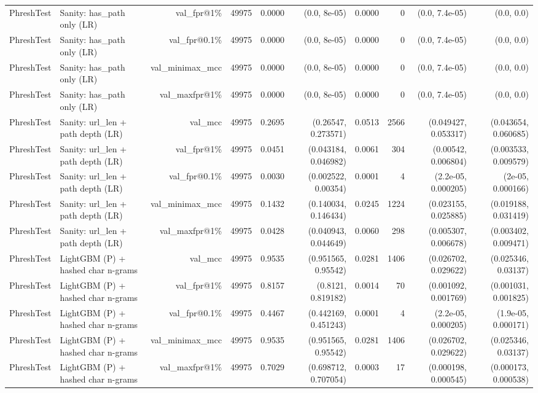 \begin{table}[t]
\begin{tabular}{llrrrrrrrr}
PhreshTest & Sanity: has\_path only (LR) & val\_fpr@1\% & 49975 & 0.0000 & (0.0, 8e-05) & 0.0000 & 0 & (0.0, 7.4e-05) & (0.0, 0.0) \\
PhreshTest & Sanity: has\_path only (LR) & val\_fpr@0.1\% & 49975 & 0.0000 & (0.0, 8e-05) & 0.0000 & 0 & (0.0, 7.4e-05) & (0.0, 0.0) \\
PhreshTest & Sanity: has\_path only (LR) & val\_minimax\_mcc & 49975 & 0.0000 & (0.0, 8e-05) & 0.0000 & 0 & (0.0, 7.4e-05) & (0.0, 0.0) \\
PhreshTest & Sanity: has\_path only (LR) & val\_maxfpr@1\% & 49975 & 0.0000 & (0.0, 8e-05) & 0.0000 & 0 & (0.0, 7.4e-05) & (0.0, 0.0) \\
PhreshTest & Sanity: url\_len + path depth (LR) & val\_mcc & 49975 & 0.2695 & (0.26547, 0.273571) & 0.0513 & 2566 & (0.049427, 0.053317) & (0.043654, 0.060685) \\
PhreshTest & Sanity: url\_len + path depth (LR) & val\_fpr@1\% & 49975 & 0.0451 & (0.043184, 0.046982) & 0.0061 & 304 & (0.00542, 0.006804) & (0.003533, 0.009579) \\
PhreshTest & Sanity: url\_len + path depth (LR) & val\_fpr@0.1\% & 49975 & 0.0030 & (0.002522, 0.00354) & 0.0001 & 4 & (2.2e-05, 0.000205) & (2e-05, 0.000166) \\
PhreshTest & Sanity: url\_len + path depth (LR) & val\_minimax\_mcc & 49975 & 0.1432 & (0.140034, 0.146434) & 0.0245 & 1224 & (0.023155, 0.025885) & (0.019188, 0.031419) \\
PhreshTest & Sanity: url\_len + path depth (LR) & val\_maxfpr@1\% & 49975 & 0.0428 & (0.040943, 0.044649) & 0.0060 & 298 & (0.005307, 0.006678) & (0.003402, 0.009471) \\
PhreshTest & LightGBM (P) + hashed char n-grams & val\_mcc & 49975 & 0.9535 & (0.951565, 0.95542) & 0.0281 & 1406 & (0.026702, 0.029622) & (0.025346, 0.03137) \\
PhreshTest & LightGBM (P) + hashed char n-grams & val\_fpr@1\% & 49975 & 0.8157 & (0.8121, 0.819182) & 0.0014 & 70 & (0.001092, 0.001769) & (0.001031, 0.001825) \\
PhreshTest & LightGBM (P) + hashed char n-grams & val\_fpr@0.1\% & 49975 & 0.4467 & (0.442169, 0.451243) & 0.0001 & 4 & (2.2e-05, 0.000205) & (1.9e-05, 0.000171) \\
PhreshTest & LightGBM (P) + hashed char n-grams & val\_minimax\_mcc & 49975 & 0.9535 & (0.951565, 0.95542) & 0.0281 & 1406 & (0.026702, 0.029622) & (0.025346, 0.03137) \\
PhreshTest & LightGBM (P) + hashed char n-grams & val\_maxfpr@1\% & 49975 & 0.7029 & (0.698712, 0.707054) & 0.0003 & 17 & (0.000198, 0.000545) & (0.000173, 0.000538) \\

\end{tabular}
\end{table}
